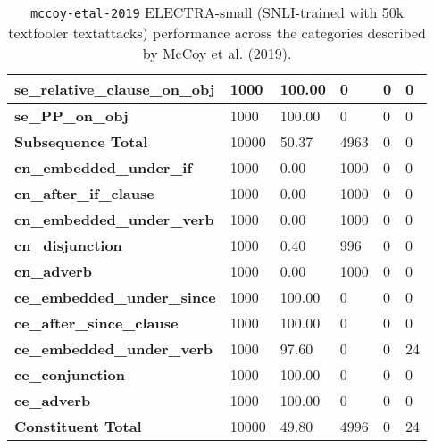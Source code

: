 \begin{table}[!ht]
\begin{tabular}{|p{}|p{}|p{}|p{}|p{}|p{}|}
        \textbf{se\_relative\_clause\_on\_obj} & 1000 & 100.00 & 0 & 0 & 0 \\ \hline
        \textbf{se\_PP\_on\_obj} & 1000 & 100.00 & 0 & 0 & 0 \\ \hline
        \textbf{Subsequence Total} & 10000 & 50.37 & 4963 & 0 & 0 \\ \hline
        \textbf{cn\_embedded\_under\_if} & 1000 & 0.00 & 1000 & 0 & 0 \\ \hline
        \textbf{cn\_after\_if\_clause} & 1000 & 0.00 & 1000 & 0 & 0 \\ \hline
        \textbf{cn\_embedded\_under\_verb} & 1000 & 0.00 & 1000 & 0 & 0 \\ \hline
        \textbf{cn\_disjunction} & 1000 & 0.40 & 996 & 0 & 0 \\ \hline
        \textbf{cn\_adverb} & 1000 & 0.00 & 1000 & 0 & 0 \\ \hline
        \textbf{ce\_embedded\_under\_since} & 1000 & 100.00 & 0 & 0 & 0 \\ \hline
        \textbf{ce\_after\_since\_clause} & 1000 & 100.00 & 0 & 0 & 0 \\ \hline
        \textbf{ce\_embedded\_under\_verb} & 1000 & 97.60 & 0 & 0 & 24 \\ \hline
        \textbf{ce\_conjunction} & 1000 & 100.00 & 0 & 0 & 0 \\ \hline
        \textbf{ce\_adverb} & 1000 & 100.00 & 0 & 0 & 0 \\ \hline
        \textbf{Constituent Total} & 10000 & 49.80 & 4996 & 0 & 24 \\ \hline
    \end{tabular}
    \caption{\texttt{mccoy-etal-2019} ELECTRA-small (SNLI-trained with 50k textfooler textattacks) performance across the categories described by McCoy et al. (2019).}
\end{table}

